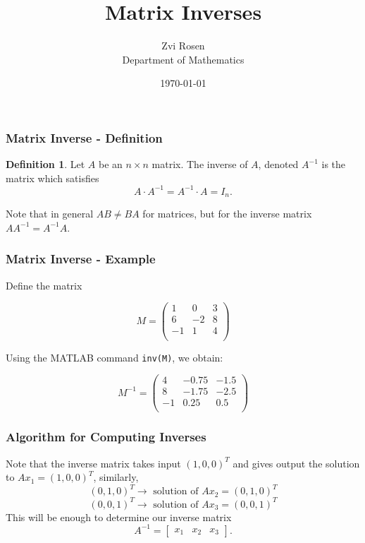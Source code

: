 \documentclass[12pt]{beamer}
\theoremstyle{definition}
\newtheorem{defn}[thm]{Definition}
\begin{document}
\author[Z. Rosen]{Zvi Rosen \\ Department of Mathematics}

\date[\today]{\today}
\title[Matrix Inverses]{{\Large Matrix Inverses}}


\frame{\titlepage}


\begin{frame}
\frametitle{Matrix Inverse - Definition}

\begin{defn}
Let $A$ be an $n \times n$ matrix. The inverse of $A$,
denoted $A^{-1}$ is the matrix which satisfies
\[ A \cdot A^{-1} = A^{-1} \cdot A = I_n.\]
\end{defn}

Note that in general $AB \neq BA$ for matrices, but for the
inverse matrix $A A^{-1} = A^{-1} A$.
\end{frame}


\begin{frame}
\frametitle{Matrix Inverse - Example}
Define the matrix

\[M = 
\left(\begin{array}{ccc}
1 & 0 & 3 \\
6 & -2 & 8 \\
-1 & 1 & 4 \\
\end{array}\right)\]


Using the MATLAB command {\tt inv(M)}, we obtain:

\[M^{-1} = 
\left(\begin{array}{ccc}
4 & -0.75 & -1.5 \\
8 & -1.75 & -2.5 \\
-1 & 0.25 & 0.5 \\
\end{array}\right)\]
\end{frame}

\begin{frame}
\frametitle{Algorithm for Computing Inverses}
Note that the inverse matrix takes input $(1,0,0)^T$ and
gives output the solution to $A x_1 = (1,0,0)^T$, similarly,
\[ (0,1,0)^T \to \text{  solution of  } Ax_2 = (0,1,0)^T \]
\[ (0,0,1)^T \to \text{  solution of  } Ax_3 = (0,0,1)^T \]
This will be enough to determine our inverse matrix 
\[A^{-1} = \left[ \begin{array}{c|c|c} x_1 & x_2 & x_3 \end{array} \right]. \]
\end{frame}
\end{document}
